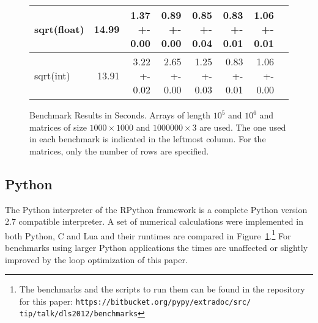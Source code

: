 \documentclass[preprint]{sigplanconf}
\begin{document}
\begin{figure}
\begin{center}
{\begin{tabular}{|l|r|r|r|r|r|r|r|}
\hline
sqrt(float) & 14.99 & 1.37 +- 0.00 & 0.89 +- 0.00 & 0.85 +- 0.04 & 0.83 +- 0.01 & 1.06 +- 0.01\\
\hline
sqrt(int) & 13.91 & 3.22 +- 0.02 & 2.65 +- 0.00 & 1.25 +- 0.03 & 0.83 +- 0.01 & 1.06 +- 0.00\\
\hline
\end{tabular}
}
\end{center}
\label{fig:benchmarks}
\caption{Benchmark Results in Seconds. Arrays of length $10^5$ and
  $10^6$ and matrices of size $1000\times 1000$ and $1000000 \times
  3$ are used. The one used in each benchmark is indicated in
  the leftmost column. For the matrices, only the number of rows are
  specified.} 
\end{figure}

\subsection{Python}
The Python interpreter of the RPython framework is a complete Python
version 2.7 compatible interpreter. A set of numerical
calculations were implemented in both Python, C and Lua and their
runtimes are compared in Figure~\ref{fig:benchmarks}.\footnote{
    The benchmarks and the scripts to run them can be found in the repository for this paper:
    \texttt{https://bitbucket.org/pypy/extradoc/src/ tip/talk/dls2012/benchmarks}
}
For benchmarks using larger Python applications the times are unaffected or
slightly improved by the loop optimization of this paper.
\end{document}
